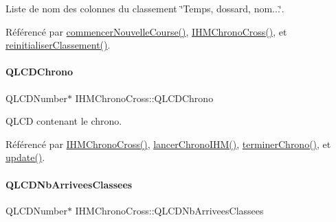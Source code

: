 Liste de nom des colonnes du classement \char`\"{}\+Temps, dossard, nom...\char`\"{}. 



Référencé par \hyperlink{class_i_h_m_chrono_cross_ab899a1d60c1f853b199abb937ae08e74}{commencer\+Nouvelle\+Course()}, \hyperlink{class_i_h_m_chrono_cross_a479fc90733fba3e65fb06aa4a3adc02e}{I\+H\+M\+Chrono\+Cross()}, et \hyperlink{class_i_h_m_chrono_cross_aaf8fa3bf16956fd0e0ceeab6e65f6741}{reinitialiser\+Classement()}.

\mbox{\label{class_i_h_m_chrono_cross_a6169c1483faab14d1f619d1d838c198e}} 
\paragraph{\texorpdfstring{Q\+L\+C\+D\+Chrono}{QLCDChrono}}
{\footnotesize\ttfamily Q\+L\+C\+D\+Number$\ast$ I\+H\+M\+Chrono\+Cross\+::\+Q\+L\+C\+D\+Chrono\hspace{0.3cm}{\ttfamily [private]}}



Q\+L\+CD contenant le chrono. 



Référencé par \hyperlink{class_i_h_m_chrono_cross_a479fc90733fba3e65fb06aa4a3adc02e}{I\+H\+M\+Chrono\+Cross()}, \hyperlink{class_i_h_m_chrono_cross_a0e78f2d4d5e46c4551fc4517614a56d8}{lancer\+Chrono\+I\+H\+M()}, \hyperlink{class_i_h_m_chrono_cross_a32ee157ca6bd8c3e94b57f3cecdeee4e}{terminer\+Chrono()}, et \hyperlink{class_i_h_m_chrono_cross_a2cc8b686168528ab0d642a0cba6e1c5a}{update()}.

\mbox{\label{class_i_h_m_chrono_cross_aeba189eacad7e19e009ae4764f98b9be}} 
\paragraph{\texorpdfstring{Q\+L\+C\+D\+Nb\+Arrivees\+Classees}{QLCDNbArriveesClassees}}
{\footnotesize\ttfamily Q\+L\+C\+D\+Number$\ast$ I\+H\+M\+Chrono\+Cross\+::\+Q\+L\+C\+D\+Nb\+Arrivees\+Classees\hspace{0.3cm}{\ttfamily [private]}}



